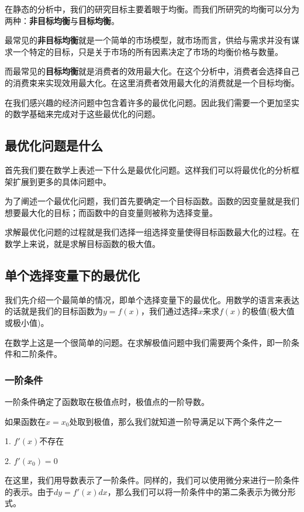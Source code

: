 \documentclass[UTF8,12pt]{ctexart}
\numberwithin{equation}{section} %
\numberwithin{figure}{section}
\numberwithin{table}{section}
\begin{document}
	在静态的分析中，我们的研究目标主要着眼于均衡。而我们所研究的均衡可以分为两种：\textbf{非目标均衡}与\textbf{目标均衡}。
	
	最常见的\textbf{非目标均衡}就是一个简单的市场模型，就市场而言，供给与需求并没有谋求一个特定的目标，只是关于市场的所有因素决定了市场的均衡价格与数量。
	
	而最常见的\textbf{目标均衡}就是消费者的效用最大化。在这个分析中，消费者会选择自己的消费束来实现效用最大化。在这里消费者效用最大化的消费就是一个目标均衡。
	
	在我们感兴趣的经济问题中包含着许多的最优化问题。因此我们需要一个更加坚实的数学基础来完成对于这些最优化的问题。
	
	\subsection{最优化问题是什么}
	
	首先我们要在数学上表述一下什么是最优化问题。这样我们可以将最优化的分析框架扩展到更多的具体问题中。
	
	为了阐述一个最优化问题，我们首先要确定一个目标函数。函数的因变量就是我们想要最大化的目标；而函数中的自变量则被称为选择变量。
	
	求解最优化问题的过程就是我们选择一组选择变量使得目标函数最大化的过程。在数学上来说，就是求解目标函数的极大值。
	
	\subsection{单个选择变量下的最优化}
	
	我们先介绍一个最简单的情况，即单个选择变量下的最优化。用数学的语言来表达的话就是我们的目标函数为$y = f(x)$，我们通过选择$x$来求$f(x)$的极值(极大值或极小值)。
	
	在数学上这是一个很简单的问题。在求解极值问题中我们需要两个条件，即一阶条件和二阶条件。
	
	\subsubsection{一阶条件}
	
	一阶条件确定了函数取在极值点时，极值点的一阶导数。
	
	如果函数在$x = x_0$处取到极值，那么我们就知道一阶导满足以下两个条件之一
	
	1. $f'(x)$不存在
	
	2. $f'(x_0) = 0$
	
	在这里，我们用导数表示了一阶条件。同样的，我们可以使用微分来进行一阶条件的表示。由于$dy = f'(x)dx$，那么我们可以将一阶条件中的第二条表示为微分形式。
	
\end{document}
